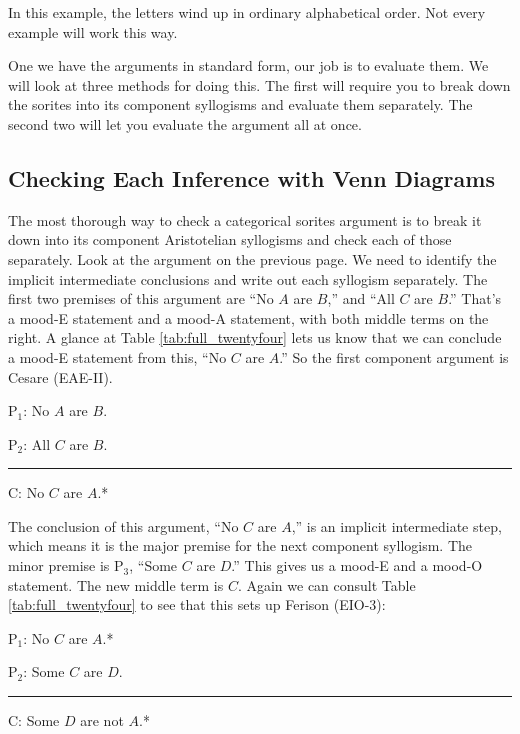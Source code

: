 {In this example, the letters wind up in ordinary alphabetical order. Not every example will work this way.

One we have the arguments in standard form, our job is to evaluate them. We will look at three methods for doing this. The first will require you to break down the sorites into its component syllogisms and evaluate them separately. The second two will let you evaluate the argument all at once. 

\subsection{Checking Each Inference with Venn Diagrams}

The most thorough way to check a categorical sorites argument is to break it down into its component Aristotelian syllogisms and check each of those separately. Look at the argument on the previous page. We need to identify the implicit intermediate conclusions and write out each syllogism separately. The first two premises of this argument are ``No $A$ are $B$,'' and ``All $C$ are $B$.'' That's a mood-E statement and a mood-A statement, with both middle terms on the right. A glance at Table \ref{tab:full_twentyfour} lets us know that we can conclude a mood-E statement from this, ``No $C$ are $A$.'' So the first component argument is Cesare (EAE-II).

\begin{earg}
\item[P$_1$:] No $A$ are $B$.
\item[P$_2$:] All $C$ are $B$. %
\vspace{-.5em}
\item [] \rule{0.2\linewidth}{.5pt} 
\item[C:] No $C$ are $A$.*
\end{earg}

The conclusion of this argument, ``No $C$ are $A$,'' is an implicit intermediate step, which means it is the major premise for the next component syllogism. The minor premise is P$_3$, ``Some $C$ are $D$.'' This gives us a mood-E and a mood-O statement. The new middle term is $C$. Again we can consult Table \ref{tab:full_twentyfour} to see that this sets up Ferison (EIO-3): 

\begin{earg}
\item[P$_1$:] No $C$ are $A$.*
\item[P$_2$:] Some $C$ are $D$.%
\vspace{-.5em}
\item [] \rule{0.2\linewidth}{.5pt} 
\item[C:] Some $D$ are not $A$.* 
\end{earg}

}
